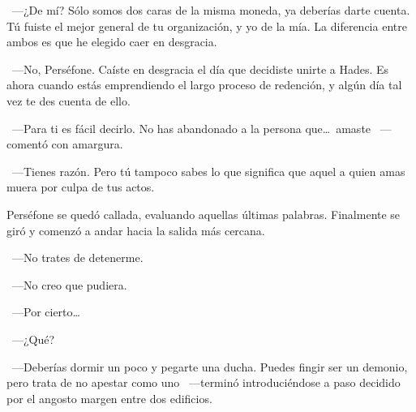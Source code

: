 ~---¿De mí? Sólo somos dos caras de la misma moneda, ya deberías darte cuenta. Tú fuiste el mejor general de tu organización, y yo de la mía. La diferencia entre ambos es que he elegido caer en desgracia.

~---No, Perséfone. Caíste en desgracia el día que decidiste unirte a Hades. Es ahora cuando estás emprendiendo el largo proceso de redención, y algún día tal vez te des cuenta de ello.

~---Para ti es fácil decirlo. No has abandonado a la persona que\dots\ amaste ~---comentó con amargura.

~---Tienes razón. Pero tú tampoco sabes lo que significa que aquel a quien amas muera por culpa de tus actos.

Perséfone se quedó callada, evaluando aquellas últimas palabras. Finalmente se giró y comenzó a andar hacia la salida más cercana.

~---No trates de detenerme.

~---No creo que pudiera.

~---Por cierto\dots

~---¿Qué?

~---Deberías dormir un poco y pegarte una ducha. Puedes fingir ser un demonio, pero trata de no apestar como uno ~---terminó introduciéndose a paso decidido por el angosto margen entre dos edificios.

\endinput
